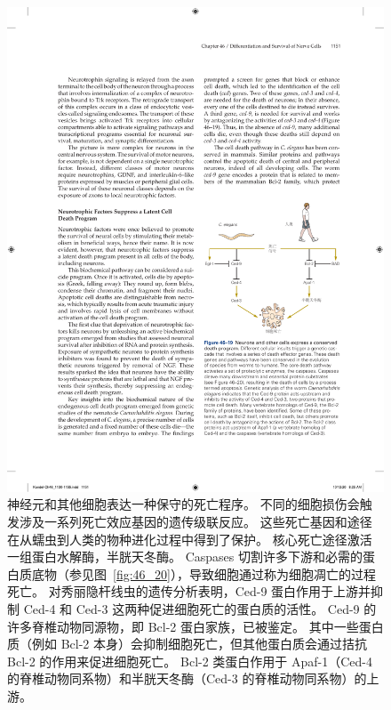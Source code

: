 \begin{figure}[htbp]
	\centering
	\includegraphics[width=0.9\linewidth]{chap46/fig_46_19}
	\caption{神经元和其他细胞表达一种保守的死亡程序。
	不同的细胞损伤会触发涉及一系列死亡效应基因的遗传级联反应。
	这些死亡基因和途径在从蠕虫到人类的物种进化过程中得到了保护。
	核心死亡途径激活一组蛋白水解酶，半胱天冬酶。
	Caspases 切割许多下游和必需的蛋白质底物（参见图~\ref{fig:46_20}），导致细胞通过称为细胞凋亡的过程死亡。
	对秀丽隐杆线虫的遗传分析表明，Ced-9 蛋白作用于上游并抑制 Ced-4 和 Ced-3 这两种促进细胞死亡的蛋白质的活性。
	Ced-9 的许多脊椎动物同源物，即 Bcl-2 蛋白家族，已被鉴定。
	其中一些蛋白质（例如 Bcl-2 本身）会抑制细胞死亡，但其他蛋白质会通过拮抗 Bcl-2 的作用来促进细胞死亡。
	Bcl-2 类蛋白作用于 Apaf-1（Ced-4 的脊椎动物同系物）和半胱天冬酶（Ced-3 的脊椎动物同系物）的上游。}
	\label{fig:46_19}
\end{figure}


